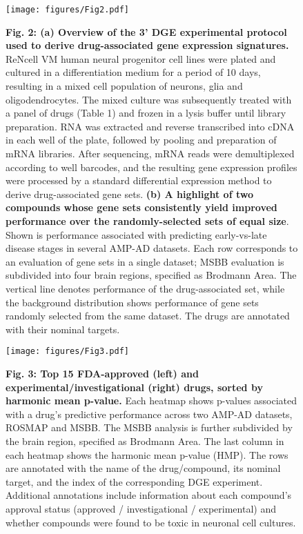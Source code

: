 \documentclass{article}
\begin{document}
\begin{figure}
  \texttt{[image: figures/Fig2.pdf]}
  \caption*{\textbf{Fig. 2: (a) Overview of the 3’ DGE experimental protocol used to derive drug-associated gene expression signatures.} ReNcell VM human neural progenitor cell lines were plated and cultured in a differentiation medium for a period of 10 days, resulting in a mixed cell population of neurons, glia and oligodendrocytes. The mixed culture was subsequently treated with a panel of drugs (Table 1) and frozen in a lysis buffer until library preparation. RNA was extracted and reverse transcribed into cDNA in each well of the plate, followed by pooling and preparation of mRNA libraries. After sequencing, mRNA reads were demultiplexed according to well barcodes, and the resulting gene expression profiles were processed by a standard differential expression method to derive drug-associated gene sets. \textbf{(b) A highlight of two compounds whose gene sets consistently yield improved performance over the randomly-selected sets of equal size}. Shown is performance associated with predicting early-vs-late disease stages in several AMP-AD datasets. Each row corresponds to an evaluation of gene sets in a single dataset; MSBB evaluation is subdivided into four brain regions, specified as Brodmann Area. The vertical line denotes performance of the drug-associated set, while the background distribution shows performance of gene sets randomly selected from the same dataset. The drugs are annotated with their nominal targets.}
\end{figure}


\begin{landscape}
  \begin{figure}
    \begin{center}
      \texttt{[image: figures/Fig3.pdf]}
    \end{center}
    \caption*{\textbf{Fig. 3: Top 15 FDA-approved (left) and experimental/investigational (right) drugs, sorted by harmonic mean p-value.} Each heatmap shows p-values associated with a drug’s predictive performance across two AMP-AD datasets, ROSMAP and MSBB. The MSBB analysis is further subdivided by the brain region, specified as Brodmann Area. The last column in each heatmap shows the harmonic mean p-value (HMP). The rows are annotated with the name of the drug/compound, its nominal target, and the index of the corresponding DGE experiment. Additional annotations include information about each compound’s approval status (approved / investigational / experimental) and whether compounds were found to be toxic in neuronal cell cultures.}
\end{figure}
\end{landscape}
\end{document}
